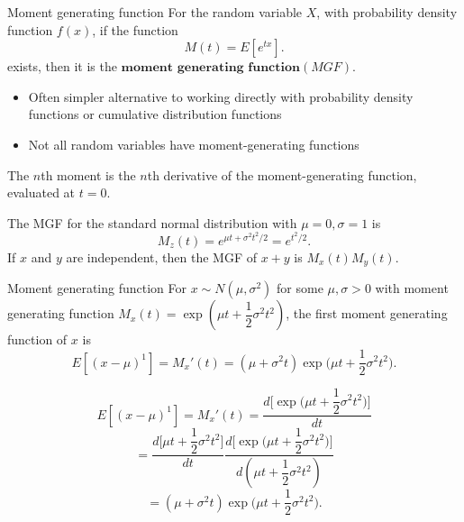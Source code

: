 \documentclass[11pt,table]{beamer}
\begin{document}
\begin{frame}{Moment generating function}
For the random variable $X$, with probability density function $f(x)$, if the function
\begin{equation*}
    M(t) = E[e^{tx}].
\end{equation*}
exists, then it is the $\textbf{moment generating function}(MGF)$.

\begin{itemize}
	\item Often simpler alternative to working directly with probability density functions or cumulative distribution functions
	\item Not all random variables have moment-generating functions
\end{itemize}
The $n$th moment is the $n$th derivative of the moment-generating function, evaluated at $t=0$. 

\begin{example}
The MGF for the standard normal distribution with $\mu=0, \sigma=1$ is $$M_{z}(t) = e^{\mu t+ \sigma^2t^{2}/2} = e^{t^{2}/2}.$$
If $x$ and $y$ are independent, then the MGF of $x + y$ is $M_{x}(t)M_{y}(t).$
\end{example}
\end{frame}


\begin{frame}{Moment generating function}
\small
For $x \sim N (\mu, \sigma^2)$ for some $\mu,\sigma>0$ with moment generating function ${M_x}(t) =  \exp (\mu t + \dfrac 1 2 \sigma^2 t^2)$, the first moment generating function of $x$ is
$$ E[(x - \mu)^{1}]={M_x}'(t)= (\mu +  \sigma^2 t)\exp \bigg(\mu t + \dfrac 1 2 \sigma^2 t^2\bigg).$$
\small
\begin{example}
$$ E[(x - \mu)^{1}]={M_x}'(t) = \frac{d\bigg[\exp \bigg(\mu t + \dfrac 1 2 \sigma^2 t^2\bigg)\bigg]}{dt}$$ 
$$= \frac{d\bigg[\mu t + \dfrac 1 2 \sigma^2 t^2\bigg]}{dt}\frac{d\bigg[\exp \bigg(\mu t + \dfrac 1 2 \sigma^2 t^2\bigg)\bigg]}{d(\mu t + \dfrac 1 2 \sigma^2 t^2)}$$
$$ =(\mu +  \sigma^2 t)\exp \bigg(\mu t + \dfrac 1 2 \sigma^2 t^2\bigg).$$
\end{example}
\end{frame}
\end{document}
